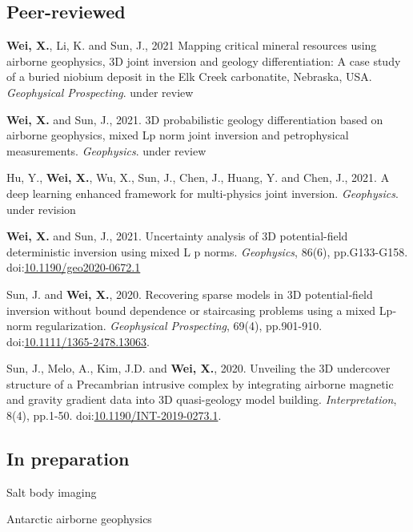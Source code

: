 \documentclass[11pt, a4paper]{article}
\newcommand{\LastName}{Wei}
\newcommand{\Initials}{X}
\newcommand{\Wei}{\textbf{\LastName, \Initials.}}  %
\newcommand{\WeiSun}{\textbf{\LastName, \Initials.} and Sun, J.}  %
\newcommand{\Review}{under review}
\newcommand{\Revision}{under revision}
\newcommand{\DOI}[1]{doi:\href{https://doi.org/#1}{#1}}
\begin{document}
\subsection*{Peer-reviewed}
\begin{etaremune}
	
	\item 
	\Wei, Li, K. and Sun, J., 2021 Mapping critical mineral resources using airborne geophysics, 3D joint inversion and geology differentiation: A case study of a buried niobium deposit in the Elk Creek carbonatite, Nebraska, USA. \emph{Geophysical Prospecting}. \Review
	
	\item 
	\WeiSun, 2021. 3D probabilistic geology differentiation based on airborne geophysics, mixed Lp norm joint inversion and petrophysical measurements. \emph{Geophysics}. \Review
	
	\item 
	Hu, Y., \Wei, Wu, X., Sun, J., Chen, J., Huang, Y. and Chen, J., 2021. A deep learning enhanced framework for multi-physics joint inversion. \emph{Geophysics}. \Revision
	
	\item
	\WeiSun, 2021. Uncertainty analysis of 3D potential-field deterministic inversion using mixed L p norms. \emph{Geophysics}, 86(6), pp.G133-G158.
	\DOI{10.1190/geo2020-0672.1}

	\item
	Sun, J. and \Wei, 2020. Recovering sparse models in 3D potential‐field inversion without bound dependence or staircasing problems using a mixed Lp‐norm regularization. \emph{Geophysical Prospecting}, 69(4), pp.901-910.
	\DOI{10.1111/1365-2478.13063}.

	\item
	Sun, J., Melo, A., Kim, J.D. and \Wei, 2020. Unveiling the 3D undercover structure of a Precambrian intrusive complex by integrating airborne magnetic and gravity gradient data into 3D quasi-geology model building. \emph{Interpretation}, 8(4), pp.1-50.
	\DOI{10.1190/INT-2019-0273.1}.

\end{etaremune}

\subsection*{In preparation}
\begin{etaremune}
	\item
	Salt body imaging
	
	\item 
	Antarctic airborne geophysics

	
\end{etaremune}
\end{document}

